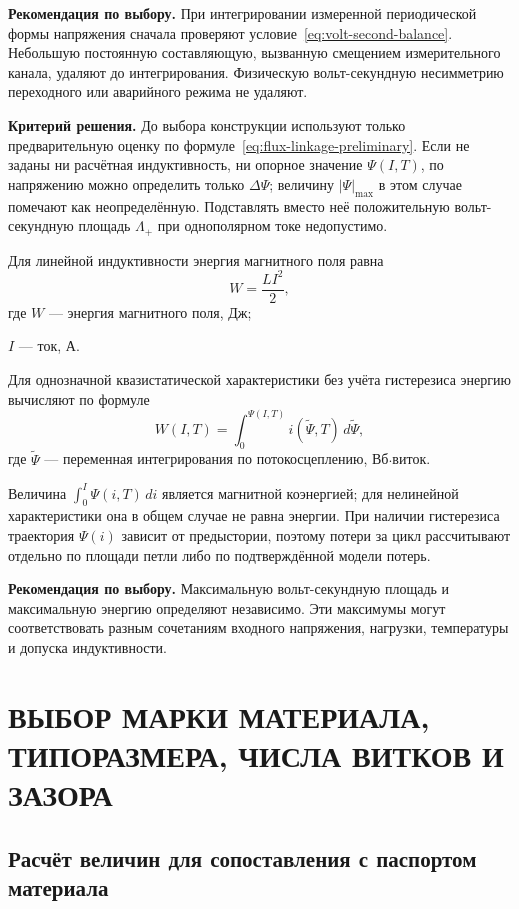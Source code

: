 \documentclass[14pt,a4paper]{extarticle}
\newcommand{\recommend}{\par\noindent\textbf{Рекомендация по выбору.} }
\newcommand{\criterion}{\par\noindent\textbf{Критерий решения.} }
\begin{document}
\recommend При интегрировании измеренной периодической формы напряжения
сначала проверяют условие~\eqref{eq:volt-second-balance}. Небольшую постоянную
составляющую, вызванную смещением измерительного канала, удаляют до
интегрирования. Физическую вольт-секундную несимметрию переходного или
аварийного режима не удаляют.

\criterion До выбора конструкции используют только предварительную оценку
по формуле~\eqref{eq:flux-linkage-preliminary}. Если не заданы ни расчётная
индуктивность, ни опорное значение $\Psi(I,T)$, по напряжению можно определить
только $\Delta\Psi$; величину $\left|\Psi\right|_{\max}$ в этом случае
помечают как неопределённую. Подставлять вместо неё положительную
вольт-секундную площадь $\Lambda_+$ при однополярном токе недопустимо.

Для линейной индуктивности энергия магнитного поля равна
\begin{equation}
 W=\frac{L I^2}{2},
 \label{eq:energy-linear}
\end{equation}
где $W$ --- энергия магнитного поля, Дж;\par\noindent
$I$ --- ток, А.

Для однозначной квазистатической характеристики без учёта гистерезиса
энергию вычисляют по формуле
\begin{equation}
 W(I,T)=
 \int_{0}^{\Psi(I,T)}i(\widetilde\Psi,T)\,d\widetilde\Psi,
 \label{eq:energy-nonlinear}
\end{equation}
где $\widetilde\Psi$ --- переменная интегрирования по потокосцеплению,
Вб$\cdot$виток.

Величина $\int_0^I\Psi(i,T)\,di$ является магнитной коэнергией; для
нелинейной характеристики она в общем случае не равна энергии. При наличии
гистерезиса траектория $\Psi(i)$ зависит от предыстории, поэтому потери за
цикл рассчитывают отдельно по площади петли либо по подтверждённой модели
потерь.

\recommend Максимальную вольт-секундную площадь и максимальную энергию
определяют независимо. Эти максимумы могут соответствовать разным
сочетаниям входного напряжения, нагрузки, температуры и допуска
индуктивности.

\section{ВЫБОР МАРКИ МАТЕРИАЛА, ТИПОРАЗМЕРА, ЧИСЛА ВИТКОВ И ЗАЗОРА}
\label{sec:magnetic-design}

\subsection{Расчёт величин для сопоставления с паспортом материала}
\label{subsec:material-quantities}
\end{document}
